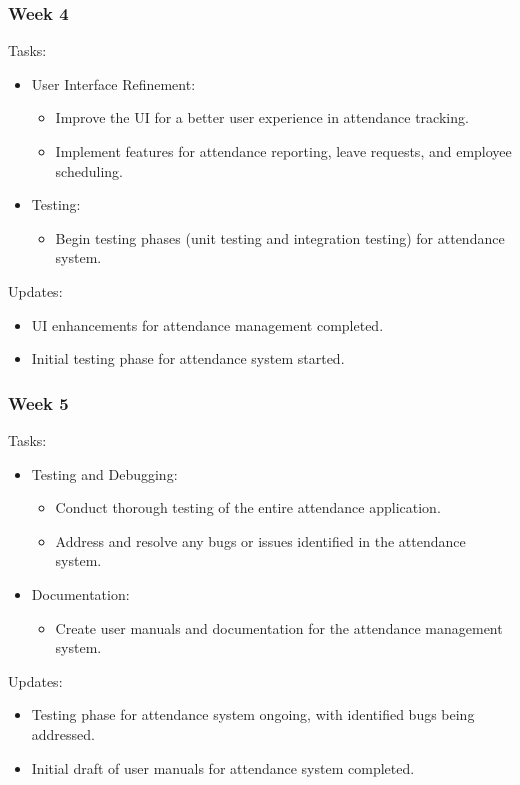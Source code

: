 \documentclass[a4paper, 12pt]{article}
\begin{document}
\subsubsection{Week 4}
Tasks:
\begin{itemize}
    \item User Interface Refinement:
    \begin{itemize}
        \item Improve the UI for a better user experience in attendance tracking.
        \item Implement features for attendance reporting, leave requests, and employee scheduling.
    \end{itemize}
    \item Testing:
    \begin{itemize}
        \item Begin testing phases (unit testing and integration testing) for attendance system.
    \end{itemize}
\end{itemize}
Updates:
\begin{itemize}
    \item UI enhancements for attendance management completed.
    \item Initial testing phase for attendance system started.
\end{itemize}

\subsubsection{Week 5}
Tasks:
\begin{itemize}
    \item Testing and Debugging:
    \begin{itemize}
        \item Conduct thorough testing of the entire attendance application.
        \item Address and resolve any bugs or issues identified in the attendance system.
    \end{itemize}
    \item Documentation:
    \begin{itemize}
        \item Create user manuals and documentation for the attendance management system.
    \end{itemize}
\end{itemize}
Updates:
\begin{itemize}
    \item Testing phase for attendance system ongoing, with identified bugs being addressed.
    \item Initial draft of user manuals for attendance system completed.
\end{itemize}
\end{document}
